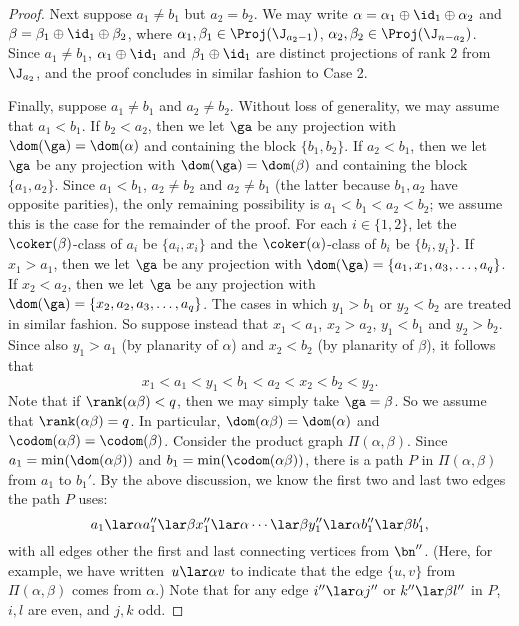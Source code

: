 \begin{proof}
\bigskip{} Next suppose $a_1\not=b_1$ but $a_2=b_2$.  We may write $\alpha=\alpha_1\oplus\id_1\oplus\alpha_2$ and $\beta=\beta_1\oplus\id_1\oplus\beta_2$, where $\alpha_1,\beta_1\in\Proj(\J_{a_2-1})$, $\alpha_2,\beta_2\in\Proj(\J_{n-a_2})$.  Since $a_1\not=b_1$, $\alpha_1\oplus\id_1$ and $\beta_1\oplus\id_1$ are distinct projections of rank $2$ from $\J_{a_2}$, and the proof concludes in similar fashion to Case 2.





\bigskip{}  Finally, suppose $a_1\not=b_1$ and $a_2\not=b_2$.  Without loss of generality, we may assume that $a_1<b_1$.  
%
If $b_2<a_2$, then we let $\ga$ be any projection with $\dom(\ga)=\dom(\alpha)$ and containing the block $\{b_1,b_2\}$.  
%
If $a_2<b_1$, then we let $\ga$ be any projection with $\dom(\ga)=\dom(\beta)$ and containing the block $\{a_1,a_2\}$.  
%
Since $a_1<b_1$, $a_2\not=b_2$ and $a_2\not=b_1$ (the latter because $b_1,a_2$ have opposite parities), the only remaining possibility is $a_1<b_1<a_2<b_2$; we assume this is the case for the remainder of the proof.
%
For each $i\in\{1,2\}$, let the $\coker(\beta)$-class of $a_i$ be $\{a_i,x_i\}$ and the $\coker(\alpha)$-class of $b_i$ be $\{b_i,y_i\}$.  If $x_1>a_1$, then we let $\ga$ be any projection with $\dom(\ga)=\{a_1,x_1,a_3,\ldots,a_q\}$.  If $x_2<a_2$, then we let $\ga$ be any projection with $\dom(\ga)=\{x_2,a_2,a_3,\ldots,a_q\}$.  The cases in which $y_1>b_1$ or $y_2<b_2$ are treated in similar fashion.  So suppose instead that $x_1<a_1$, $x_2>a_2$,  $y_1<b_1$ and $y_2>b_2$.  Since also $y_1>a_1$ (by planarity of $\alpha$) and $x_2<b_2$ (by planarity of $\beta$), it follows that
\[
x_1<a_1<y_1<b_1<a_2<x_2<b_2<y_2.
\]
Note that if $\rank(\alpha\beta)<q$, then we may simply take $\ga=\beta$.  So we assume that $\rank(\alpha\beta)=q$.  In particular, $\dom(\alpha\beta)=\dom(\alpha)$ and $\codom(\alpha\beta)=\codom(\beta)$.  Consider the product graph $\Pi(\alpha,\beta)$.  Since $a_1=\min(\dom(\alpha\beta))$ and $b_1=\min(\codom(\alpha\beta))$, there is a path $P$ in $\Pi(\alpha,\beta)$ from $a_1$ to $b_1'$.  By the above discussion, we know the first two and last two edges the path $P$ uses:
\[
a_1 \lar\alpha a_1'' \lar\beta x_1'' \lar\alpha \cdots \lar\beta y_1'' \lar\alpha b_1'' \lar\beta b_1',
\]
with all edges other the first and last connecting vertices from $\bn''$.  (Here, for example, we have written~${u\lar\alpha v}$ to indicate that the edge $\{u,v\}$ from $\Pi(\alpha,\beta)$ comes from $\alpha$.)  Note that for any edge $i''\lar\alpha j''$ or $k''\lar\beta l''$ in $P$, $i,l$ are even, and $j,k$ odd.

\end{proof}
